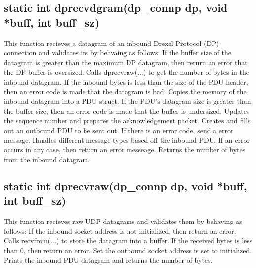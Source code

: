 \documentclass[12pt, a4paper]{article}
\begin{document}
{\subsection{static int dprecvdgram(dp\_connp dp, void *buff, int buff\_sz)}
This function recieves a datagram of an inbound Drexel Protocol (DP) connection and validates its by behvaing as follows: \newline
\indent If the buffer size of the datagram is greater than the maximum DP \newline
\indent\indent datagram, then return an error that the DP buffer is oversized. \newline
\indent Calls dprecvraw(...) to get the number of bytes in the inbound datagram. \newline
\indent If the inbound bytes is less than the size of the PDU header, then an \newline
\indent\indent error code is made that the datagram is bad. \newline
\indent Copies the memory of the inbound datagram into a PDU struct. If the \newline 
\indent\indent PDU's datagram size is greater than the buffer size, then an error \newline
\indent\indent code is made that the buffer is undersized. \newline
\indent Updates the sequence number and prepares the acknowledgement packet. \newline
\indent Creates and fills out an outbound PDU to be sent out. \newline
\indent If there is an error code, send a error message. \newline
\indent Handles different message types based off the inbound PDU. If an \newline
\indent\indent error occurs in any case, then return an error messeage. \newline
\indent Returns the number of bytes from the inbound datagram.

\subsection{static int dprecvraw(dp\_connp dp, void *buff, int buff\_sz)}
This function recieves raw UDP datagrams and validates them by behaving as follows: \newline
\indent If the inbound socket address is not initialized, then return an error. \newline
\indent Calls recvfrom(...) to store the datagram into a buffer. \newline
\indent If the received bytes is less than 0, then return an error. \newline
\indent Set the outbound socket address is set to initialized. \newline
\indent Prints the inbound PDU datagram and returns the number of bytes.

}
\end{document}
